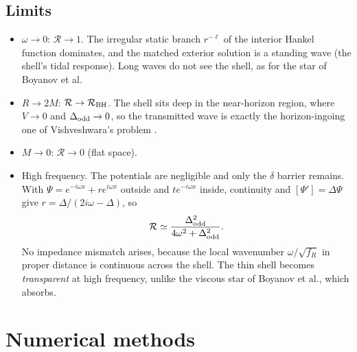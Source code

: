 \documentclass[11pt,a4paper]{article}
\numberwithin{equation}{section}
\newcommand{\sq}{\sqrt{f_R}}
\newcommand{\RR}{\mathcal R}
\begin{document}
\subsection{Limits}
\begin{itemize}
\item $\omega\to0$: $\RR\to1$. The irregular static branch $r^{-\ell}$ of the interior Hankel function dominates, and
the matched exterior solution is a standing wave (the shell's tidal response). Long waves do not see the shell, as
for the star of Boyanov et al.
\item $R\to2M$: $\RR\to\RR_{\rm BH}$. The shell sits deep in the near-horizon region, where $V\to0$ and
$\Delta_{\rm odd}\to0$, so the transmitted wave is exactly the horizon-ingoing one of Vishveshwara's problem
\cite{Vishveshwara70}.
\item $M\to0$: $\RR\to0$ (flat space).
\item High frequency. The potentials are negligible and only the $\delta$ barrier remains. With
$\Psi=e^{-i\omega x}+re^{i\omega x}$ outside and $te^{-i\omega x}$ inside, continuity and
$[\Psi']=\Delta\Psi$ give $r=\Delta/(2i\omega-\Delta)$, so
\begin{equation}
\RR\simeq\frac{\Delta_{\rm odd}^2}{4\omega^2+\Delta_{\rm odd}^2}.
\label{eq:deltalaw}
\end{equation}
No impedance mismatch arises, because the local wavenumber $\omega/\sq$ in proper distance is continuous across the
shell. The thin shell becomes \emph{transparent} at high frequency, unlike the viscous star of Boyanov et al., which
absorbs.
\end{itemize}

\section{Numerical methods}\label{sec:num}
\end{document}

